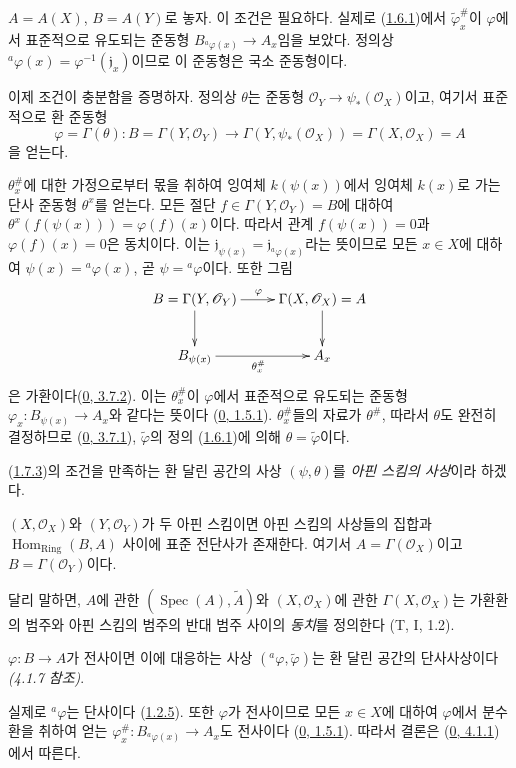 $A=A(X)$, $B=A(Y)$로 놓자. 이 조건은 필요하다. 실제로
(\hyperref[I.1.6.1-ko]{1.6.1})에서
$\widetilde\varphi_x^{\#}$이 $\varphi$에서 표준적으로 유도되는 준동형
$B_{{}^a\varphi(x)}\to A_x$임을 보았다. 정의상
${}^a\varphi(x)=\varphi^{-1}(\mathfrak{j}_x)$이므로 이 준동형은 국소
준동형이다.

이제 조건이 충분함을 증명하자. 정의상 $\theta$는 준동형
$\mathscr{O}_Y\to\psi_*(\mathscr{O}_X)$이고, 여기서 표준적으로 환 준동형
\[
  \varphi=\Gamma(\theta):
  B=\Gamma(Y,\mathscr{O}_Y)
  \longrightarrow
  \Gamma(Y,\psi_*(\mathscr{O}_X))
  =\Gamma(X,\mathscr{O}_X)=A
\]
을 얻는다.

$\theta_x^{\#}$에 대한 가정으로부터 몫을 취하여 잉여체
$k(\psi(x))$에서 잉여체 $k(x)$로 가는 단사 준동형 $\theta^x$를 얻는다.
모든 절단 $f\in\Gamma(Y,\mathscr{O}_Y)=B$에 대하여
$\theta^x(f(\psi(x)))=\varphi(f)(x)$이다. 따라서 관계
$f(\psi(x))=0$과 $\varphi(f)(x)=0$은 동치이다. 이는
$\mathfrak{j}_{\psi(x)}=\mathfrak{j}_{{}^a\varphi(x)}$라는 뜻이므로 모든
$x\in X$에 대하여 $\psi(x)={}^a\varphi(x)$, 곧
$\psi={}^a\varphi$이다. 또한 그림
\label{I.1.7.3.diagram-ko}
\[
  \xymatrix{
    B=\Gamma(Y,\mathscr{O}_Y)\ar[r]^\varphi\ar[d] &
    \Gamma(X,\mathscr{O}_X)=A\ar[d]\\
    B_{\psi(x)}\ar[r]_{\theta_x^{\#}} & A_x
  }
\]
은 가환이다(\hyperref[0.3.7.2-ko]{0, 3.7.2}). 이는
$\theta_x^{\#}$이 $\varphi$에서 표준적으로 유도되는 준동형
$\varphi_x:B_{\psi(x)}\to A_x$와 같다는 뜻이다
(\hyperref[0.1.5.1-ko]{0, 1.5.1}). $\theta_x^{\#}$들의 자료가
$\theta^{\#}$, 따라서 $\theta$도 완전히 결정하므로
(\hyperref[0.3.7.1-ko]{0, 3.7.1}),
$\widetilde\varphi$의 정의
(\hyperref[I.1.6.1-ko]{1.6.1})에 의해
$\theta=\widetilde\varphi$이다.

(\hyperref[I.1.7.3-ko]{1.7.3})의 조건을 만족하는 환 달린 공간의 사상
$(\psi,\theta)$를 \emph{아핀 스킴의 사상}이라 하겠다.

\begin{corollary}[1.7.4]
\label{I.1.7.4-ko}
$(X,\mathscr{O}_X)$와 $(Y,\mathscr{O}_Y)$가 두 아핀 스킴이면 아핀
스킴의 사상들의 집합과
$\operatorname{Hom}_{\mathrm{Ring}}(B,A)$ 사이에 표준 전단사가
존재한다. 여기서 $A=\Gamma(\mathscr{O}_X)$이고
$B=\Gamma(\mathscr{O}_Y)$이다.
\end{corollary}

달리 말하면, $A$에 관한 $(\operatorname{Spec}(A),\widetilde A)$와
$(X,\mathscr{O}_X)$에 관한 $\Gamma(X,\mathscr{O}_X)$는 가환환의 범주와
아핀 스킴의 범주의 반대 범주 사이의 \emph{동치}를 정의한다
(T, I, 1.2).

\begin{corollary}[1.7.5]
\label{I.1.7.5-ko}
$\varphi:B\to A$가 전사이면 이에 대응하는 사상
$({}^a\varphi,\widetilde\varphi)$는 환 달린 공간의 단사사상이다
\emph{(4.1.7 참조)}.
\end{corollary}

실제로 ${}^a\varphi$는 단사이다
(\hyperref[I.1.2.5-ko]{1.2.5}). 또한 $\varphi$가 전사이므로 모든
$x\in X$에 대하여 $\varphi$에서 분수환을 취하여 얻는
$\varphi_x^{\#}:B_{{}^a\varphi(x)}\to A_x$도 전사이다
(\hyperref[0.1.5.1-ko]{0, 1.5.1}). 따라서 결론은
(\hyperref[0.4.1.1-ko]{0, 4.1.1})에서 따른다.
